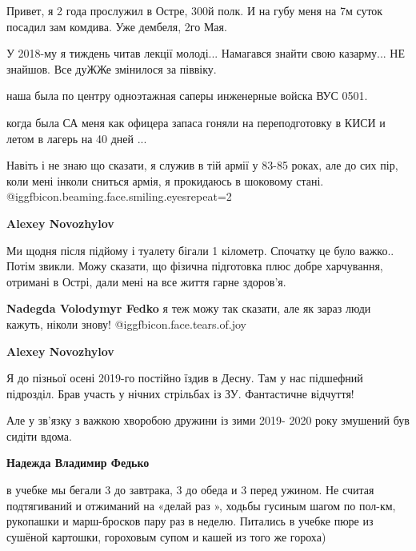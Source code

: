 \begin{itemize}
\begin{itemize}
Привет, я 2 года прослужил в Остре, 300й полк. И на губу меня на 7м суток
посадил зам комдива. Уже дембеля, 2го Мая.

\end{itemize} %


У 2018-му я тиждень читав лекції молоді... Намагався знайти свою казарму... НЕ
знайшов. Все дуЖЖе змінилося за піввіку.

\begin{itemize} %
наша была по центру одноэтажная саперы инженерные войска ВУС 0501.

когда была СА меня как офицера запаса гоняли на переподготовку в КИСИ и летом в лагерь на 40 дней ...
\end{itemize} %


Навіть і не знаю що сказати, я служив в тій армії у 83-85 роках, але до сих
пір, коли мені інколи сниться армія, я прокидаюсь в шоковому стані. @igg{fbicon.beaming.face.smiling.eyes}{repeat=2} 

\begin{itemize} %
\textbf{Alexey Novozhylov} 

Ми щодня після підйому і туалету бігали 1 кілометр. Спочатку це було важко..
Потім звикли. Можу сказати, що фізична підготовка плюс добре харчування,
отримані в Острі, дали мені на все життя гарне здоров'я.

\begin{itemize} %
\textbf{Nadegda Volodymyr Fedko} я теж можу так сказати, але як зараз люди кажуть, ніколи знову!  @igg{fbicon.face.tears.of.joy} 

\textbf{Alexey Novozhylov} 

Я до пізньої осені 2019-го постійно їздив в Десну. Там у нас підшефний
підрозділ. Брав участь у нічних стрільбах із ЗУ. Фантастичне відчуття!

Але у зв'язку з важкою хворобою дружини із зими 2019- 2020 року змушений був
сидіти вдома.


\textbf{Надежда Владимир Федько} 

в учебке мы бегали 3 до завтрака, 3 до обеда и 3 перед ужином. Не считая
подтягиваний и отжиманий на «делай раз », ходьбы гусиным шагом по пол-км,
рукопашки и марш-бросков пару раз в неделю. Питались в учебке пюре из сушёной
картошки, гороховым супом и кашей из того же гороха)


\end{itemize}
\end{itemize}
\end{itemize}
